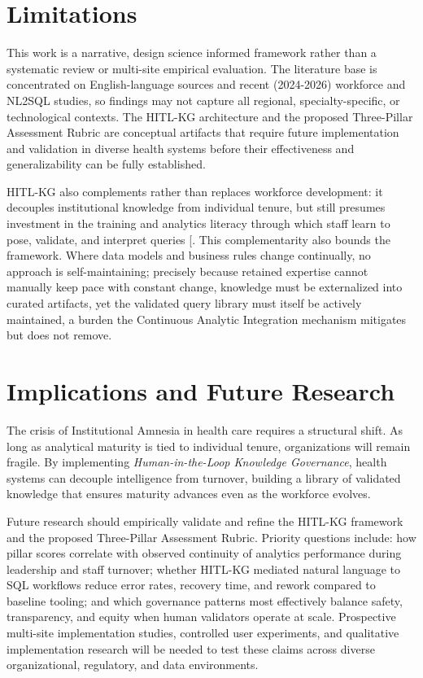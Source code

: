 \documentclass[
  american,
  11pt,
  letterpaper,
  oneside  ,captions=tableheading
]{scrartcl}
\begin{document}
\section{Limitations}\label{limitations}

This work is a narrative, design science informed framework rather than
a systematic review or multi-site empirical evaluation. The literature
base is concentrated on English-language sources and recent (2024-2026)
workforce and NL2SQL studies, so findings may not capture all regional,
specialty-specific, or technological contexts. The HITL-KG architecture
and the proposed Three-Pillar Assessment Rubric are conceptual artifacts
that require future implementation and validation in diverse health
systems before their effectiveness and generalizability can be fully
established.

HITL-KG also complements rather than replaces workforce development: it
decouples institutional knowledge from individual tenure, but still
presumes investment in the training and analytics literacy through which
staff learn to pose, validate, and interpret queries
{[}\citeproc{ref-ledikwe2013}{17}{]}. This complementarity also bounds
the framework. Where data models and business rules change continually,
no approach is self-maintaining; precisely because retained expertise
cannot manually keep pace with constant change, knowledge must be
externalized into curated artifacts, yet the validated query library
must itself be actively maintained, a burden the Continuous Analytic
Integration mechanism mitigates but does not remove.

\section{Implications and Future
Research}\label{implications-and-future-research}

The crisis of Institutional Amnesia in health care requires a structural
shift. As long as analytical maturity is tied to individual tenure,
organizations will remain fragile. By implementing
\emph{Human-in-the-Loop Knowledge Governance}, health systems can
decouple intelligence from turnover, building a library of validated
knowledge that ensures maturity advances even as the workforce evolves.

Future research should empirically validate and refine the HITL-KG
framework and the proposed Three-Pillar Assessment Rubric. Priority
questions include: how pillar scores correlate with observed continuity
of analytics performance during leadership and staff turnover; whether
HITL-KG mediated natural language to SQL workflows reduce error rates,
recovery time, and rework compared to baseline tooling; and which
governance patterns most effectively balance safety, transparency, and
equity when human validators operate at scale. Prospective multi-site
implementation studies, controlled user experiments, and qualitative
implementation research will be needed to test these claims across
diverse organizational, regulatory, and data environments.
\end{document}
